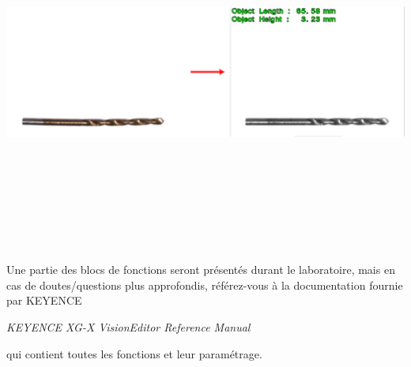 \noindent
\begin{minipage}[c]{\textwidth}
  \centering
  \includegraphics[width=16cm, height=10cm, keepaspectratio]{addOns/LaboCalib_Practical_object.png}
  \label{fig.Image_RefImagesSwitch}
\end{minipage}\\
\vspace{0.3cm}

Une partie des blocs de fonctions seront présentés durant le laboratoire, mais en cas de doutes/questions plus approfondis, référez-vous à la documentation fournie par KEYENCE 
\begin{center}
\textit{KEYENCE XG-X VisionEditor Reference Manual}
\end{center}
\noindent qui contient toutes les fonctions et leur paramétrage.

\newpage
